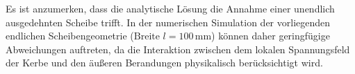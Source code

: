 Es ist anzumerken, dass die analytische Lösung die Annahme einer unendlich ausgedehnten Scheibe trifft. In der numerischen Simulation der vorliegenden endlichen Scheibengeometrie (${\text{Breite } l = 100\,\mathrm{mm}}$) können daher geringfügige Abweichungen auftreten, da die Interaktion zwischen dem lokalen Spannungsfeld der Kerbe und den äußeren Berandungen physikalisch berücksichtigt wird.